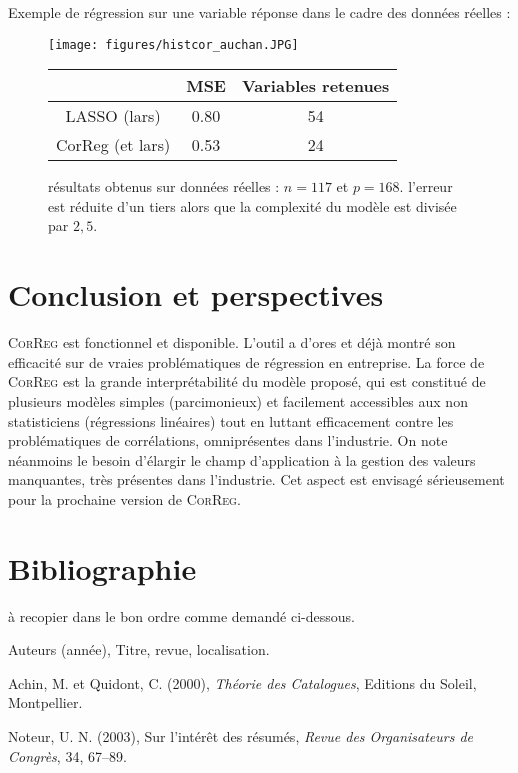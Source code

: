 \documentclass[12pt]{article}
\begin{document}
Exemple de régression sur une variable réponse dans le cadre des données réelles :
\begin{figure}[!h]
	\begin{minipage}[c]{.40\linewidth}
			\texttt{[image: figures/histcor\_auchan.JPG]} 
	\end{minipage} \hfill
   \begin{minipage}[c]{.52\linewidth}
		\begin{tabular}{|c|c|c|}
		\hline 
		  & MSE  & Variables retenues  \\ 
		\hline
		LASSO (lars) & 0.80 & 54 \\ 
		\hline 
		CorReg (et lars) & 0.53 & 24  \\ 
		\hline 
		\end{tabular} 
   \end{minipage}
   \caption{résultats obtenus sur données réelles : $n=117$ et $p=168$. l'erreur est réduite d'un tiers alors que la complexité du modèle est divisée par $2,5$.   }
\end{figure}   
	

\section{Conclusion et perspectives}
	\textsc{CorReg} est fonctionnel et disponible. L'outil a d'ores et déjà montré son efficacité sur de vraies problématiques de régression en entreprise.
	La force de \textsc{CorReg} est la grande interprétabilité du modèle proposé, qui est constitué de plusieurs modèles simples (parcimonieux) et facilement accessibles aux non statisticiens (régressions linéaires) tout en luttant efficacement contre les problématiques de corrélations, omniprésentes dans l'industrie.
	On note néanmoins le besoin d'élargir le champ d'application à la gestion des valeurs manquantes, très présentes dans l'industrie. Cet aspect est envisagé sérieusement pour la prochaine version de \textsc{CorReg}.
	

\section*{Bibliographie}
{}

à recopier dans le bon ordre comme demandé ci-dessous.

\noindent [1] Auteurs (année), Titre, revue, localisation.

\noindent [2] Achin, M. et Quidont, C. (2000), {\it Théorie des
Catalogues}, Editions du Soleil, Montpellier.

\noindent [3] Noteur, U. N. (2003), Sur l'intér\^et des
résumés, {\it Revue des Organisateurs de Congrès}, 34, 67--89.
\end{document}
